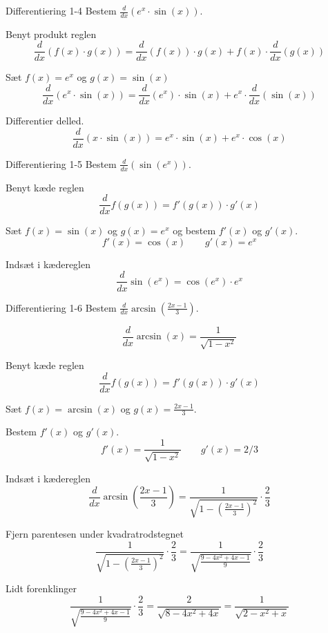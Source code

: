 \documentclass{article}
\begin{document}
\begin{exercise}{Differentiering 1-4}
Bestem $\frac{d}{dx} \left( e^x \cdot \sin(x) \right)$.


\hint
Benyt produkt reglen
\[
\frac{d}{dx} \left( f(x) \cdot g(x) \right) = \frac{d}{dx} \left( f(x) \right) \cdot g(x) + f(x) \cdot \frac{d}{dx} \left( g(x) \right)
\]

\hint
Sæt $f(x) = e^x$ og $g(x) = \sin(x)$
\[
\frac{d}{dx} \left( e^x \cdot \sin(x) \right) = \frac{d}{dx} \left( e^x \right) \cdot \sin(x) + e^x \cdot \frac{d}{dx} \left( \sin(x) \right)
\]

\hint
Differentier delled.
\[
\frac{d}{dx} \left( x \cdot \sin(x) \right) = e^x \cdot \sin(x) + e^x \cdot \cos(x)
\]
\end{exercise}



\begin{exercise}{Differentiering 1-5}
Bestem $\frac{d}{dx} \left( \sin(e^x) \right)$.


\hint
Benyt kæde reglen
\[
\frac{d}{dx} f(g(x)) = f'(g(x)) \cdot g'(x)
\]

\hint
Sæt $f(x) = \sin(x)$ og $g(x) = e^x$ og bestem $f'(x)$ og $g'(x)$.
\[
f'(x) = \cos(x) \qquad g'(x) = e^x
\]

\hint
Indsæt i kædereglen
\[
\frac{d}{dx} \sin(e^x) = \cos(e^x) \cdot e^x
\]
\end{exercise}


\begin{exercise}{Differentiering 1-6}
Bestem $\frac{d}{dx} \arcsin\left( \frac{2x - 1}{3} \right)$.



\hint
\[
\frac{d}{dx} \arcsin(x) = \frac{1}{\sqrt{1 - x^ 2}}
\]


\hint
Benyt kæde reglen
\[
\frac{d}{dx} f(g(x)) = f'(g(x)) \cdot g'(x)
\]

\hint
Sæt $f(x) = \arcsin(x)$ og $g(x) = \frac{2x - 1}{3}$.

\hint
Bestem $f'(x)$ og $g'(x)$.
\[
f'(x) = \frac{1}{\sqrt{1 - x^ 2}} \qquad g'(x) = 2/3
\]

\hint
Indsæt i kædereglen
\[
\frac{d}{dx} \arcsin\left( \frac{2x - 1}{3} \right) = \frac{1}{\sqrt{1 - \left( \frac{2x - 1}{3} \right)^ 2}} \cdot \frac{2}{3}
\]

\hint
Fjern parentesen under kvadratrodstegnet
\[
\frac{1}{\sqrt{1 - \left( \frac{2x - 1}{3} \right)^ 2}} \cdot \frac{2}{3}
= \frac{1}{\sqrt{\frac{9 - 4x^2 + 4x - 1}{9}}} \cdot \frac{2}{3}
\]

\hint
Lidt forenklinger
\[
\frac{1}{\sqrt{\frac{9 - 4x^2 + 4x - 1}{9}}} \cdot \frac{2}{3}
= \frac{2}{\sqrt{8 - 4x^2 + 4x}}
= \frac{1}{\sqrt{2 - x^2 + x}}
\]
\end{exercise}
\end{document}
